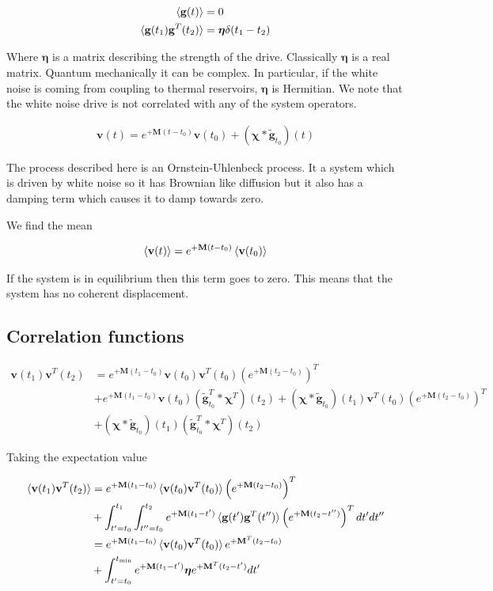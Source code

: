 \documentclass[12pt]{article}
\newcommand{\bv}[1]{\mathbf{#1}}
\begin{document}
\begin{align}
\braket{\bv{g}(t)} &= 0\\
\braket{\bv{g}(t_1)\bv{g}^T(t_2)} &= \boldsymbol{\eta} \delta(t_1-t_2)
\end{align}

Where $\boldsymbol{\eta}$ is a matrix describing the strength of the drive. Classically $\boldsymbol{\eta}$ is a real matrix. Quantum mechanically it can be complex. In particular, if the white noise is coming from coupling to thermal reservoirs, $\boldsymbol{\eta}$ is Hermitian. We note that the white noise drive is not correlated with any of the system operators.


\begin{align}
\bv{v}(t) = e^{+\bv{M}(t-t_0)}\bv{v}(t_0) + (\boldsymbol{\chi} \ast \tilde{\bv{g}}_{t_0})(t)
\end{align}

The process described here is an Ornstein-Uhlenbeck process. It a system which is driven by white noise so it has Brownian like diffusion but it also has a damping term which causes it to damp towards zero.

We find the mean

\begin{align}
\braket{\bv{v}(t)} = e^{+\bv{M}(t-t_0)}\braket{\bv{v}(t_0)}
\end{align}

If the system is in equilibrium then this term goes to zero. This means that the system has no coherent displacement.

\subsection*{Correlation functions}

\begin{align}
\bv{v}(t_1)\bv{v}^T(t_2) &= e^{+\bv{M}(t_1-t_0)}\bv{v}(t_0)\bv{v}^T(t_0)\left(e^{+\bv{M}(t_2-t_0)}\right)^T\\
&+ e^{+\bv{M}(t_1-t_0)}\bv{v}(t_0)(\tilde{\bv{g}}_{t_0}^T \ast \boldsymbol{\chi}^T)(t_2) + (\boldsymbol{\chi} \ast \tilde{\bv{g}}_{t_0})(t_1)\bv{v}^T(t_0)\left(e^{+\bv{M}(t_2-t_0)}\right)^T\\
&+ (\boldsymbol{\chi} \ast \tilde{\bv{g}}_{t_0})(t_1)(\tilde{\bv{g}}_{t_0}^T \ast \boldsymbol{\chi}^T)(t_2)
\end{align}

Taking the expectation value

\begin{align}
\braket{\bv{v}(t_1)\bv{v}^T(t_2)} &= e^{+\bv{M}(t_1-t_0)}\braket{\bv{v}(t_0)\bv{v}^T(t_0)}\left(e^{+\bv{M}(t_2-t_0)}\right)^T\\
&+\int_{t'=t_0}^{t_1}\int_{t''=t_0}^{t_2} e^{+\bv{M}(t_1-t')} \braket{\bv{g}(t')\bv{g}^T(t'')} \left(e^{+\bv{M}(t_2-t'')}\right)^T dt' dt''\\
&= e^{+\bv{M}(t_1-t_0)}\braket{\bv{v}(t_0)\bv{v}^T(t_0)}e^{+\bv{M}^T (t_2-t_0)}\\
&+\int_{t'=t_0}^{t_{\text{min}}} e^{+\bv{M}(t_1-t')} \boldsymbol{\eta} e^{+\bv{M}^T (t_2-t')} dt'
\end{align}
\end{document}
